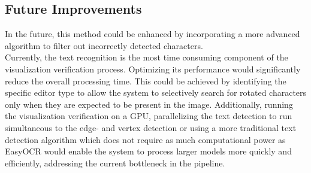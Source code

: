 \subsection{Future Improvements}
In the future, this method could be enhanced by incorporating a more advanced algorithm to filter out incorrectly detected characters.\\
Currently, the text recognition is the most time consuming component of the visualization verification process. Optimizing its performance would significantly reduce the overall processing time. This could be achieved by identifying the specific editor type to allow the system to selectively search for rotated characters only when they are expected to be present in the image. Additionally, running the visualization verification on a GPU, parallelizing the text detection to run simultaneous to the edge- and vertex detection or using a more traditional text detection algorithm which does not require as much computational power as EasyOCR would enable the system to process larger models more quickly and efficiently, addressing the current bottleneck in the pipeline.\\
